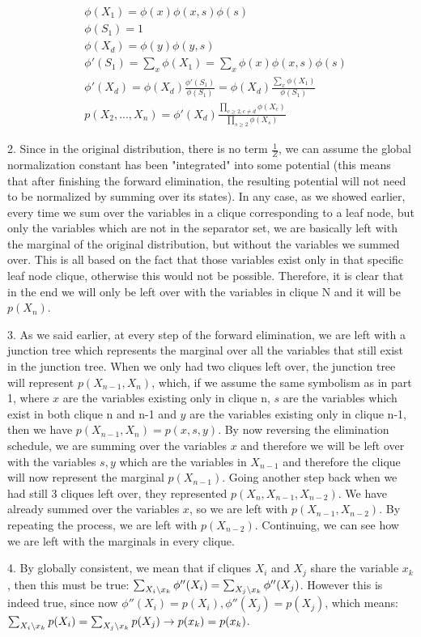 \documentclass[11pt,a4paper,oneside]{report}
\newcommand\SLASH{\char`\\}
\begin{document}
	\begin{align*}
	&\phi(X_1) = \phi(x)\phi(x,s)\phi(s)\\
	&\phi(S_1) = 1\\
	&\phi(X_d) = \phi(y)\phi(y,s)\\
	&\phi'(S_1) = \sum_{x}\phi(X_1)=\sum_{x}\phi(x)\phi(x,s)\phi(s)\\
	&\phi'(X_d) = \phi(X_d)\frac{\phi'(S_1)}{\phi(S_1)}=\phi(X_d)\frac{\sum_{x}\phi(X_1)}{\phi(S_1)}\\
	&p(X_2,...,X_n)=\phi'(X_d)\frac{\prod_{c \geq 2,c\neq d}\phi(X_c)}{\prod_{s \geq 2}\phi(X_s)}
	\end{align*}	
	
	2. Since in the original distribution, there is no term $\frac{1}{Z}$, we can assume the global normalization constant has been "integrated" into some potential (this means that after finishing the forward elimination, the resulting potential will not need to be normalized by summing over its states). In any case, as we showed earlier, every time we sum over the variables in a clique corresponding to a leaf node, but only the variables which are not in the separator set, we are basically left with the marginal of the original distribution, but without the variables we summed over. This is all based on the fact that those variables exist only in that specific leaf node clique, otherwise this would not be possible. Therefore, it is clear that in the end we will only be left over with the variables in clique N and it will be $p(X_n)$.
	
	3. As we said earlier, at every step of the forward elimination, we are left with a junction tree which represents the marginal over all the variables that still exist in the junction tree. When we only had two cliques left over, the junction tree will represent $p(X_{n-1},X_n)$, which, if we assume the same symbolism as in part 1, where $x$ are the variables existing only in clique n, $s$ are the variables which exist in both clique n and n-1 and $y$ are the variables existing only in clique n-1, then we have $p(X_{n-1},X_n)=p(x,s,y)$. By now reversing the elimination schedule, we are summing over the variables $x$ and therefore we will be left over with the variables $s,y$ which are the variables in $X_{n-1}$ and therefore the clique will now represent the marginal $p(X_{n-1})$. Going another step back when we had still 3 cliques left over, they represented $p(X_n,X_{n-1},X_{n-2})$. We have already summed over the variables $x$, so we are left with $p(X_{n-1},X_{n-2})$. By repeating the process, we are 
left with $p(X_{n-2})$. Continuing, we can see how we are left with the marginals in every clique.
	
	4. By globally consistent, we mean that if cliques $X_i$ and $X_j$ share the variable $x_k$, then this must be true: $\sum_{X_i \SLASH x_k} \phi''(X_i) = \sum_{X_j \SLASH x_k} \phi''(X_j)$. However this is indeed true, since now $\phi''(X_i)=p(X_i),\phi''(X_j)=p(X_j)$, which means: $\sum_{X_i \SLASH x_k} p(X_i) = \sum_{X_j \SLASH x_k} p(X_j) \rightarrow p(x_k)=p(x_k)$. 
\end{document}
